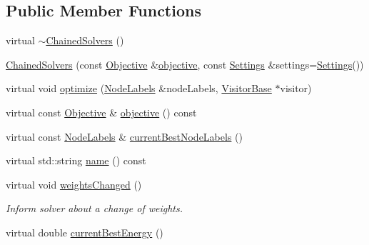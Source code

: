 \subsection*{Public Member Functions}
\begin{DoxyCompactItemize}
\item 
virtual \hyperlink{classnifty_1_1graph_1_1ChainedSolvers_a54c7367c6886af3dc8d484c9ed1d2cc5}{$\sim$\+Chained\+Solvers} ()
\item 
\hyperlink{classnifty_1_1graph_1_1ChainedSolvers_aa15e6835ad08bbc1daf51f676887b9bf}{Chained\+Solvers} (const \hyperlink{classnifty_1_1graph_1_1ChainedSolvers_a963bd16d8459fe660e207c4a57facf5e}{Objective} \&\hyperlink{classnifty_1_1graph_1_1ChainedSolvers_a2ab1b10b87194aa4f4139e4a9ad16632}{objective}, const \hyperlink{structnifty_1_1graph_1_1ChainedSolvers_1_1Settings}{Settings} \&settings=\hyperlink{structnifty_1_1graph_1_1ChainedSolvers_1_1Settings}{Settings}())
\item 
virtual void \hyperlink{classnifty_1_1graph_1_1ChainedSolvers_a1459a25679420dbca4fdecad9ed182fd}{optimize} (\hyperlink{classnifty_1_1graph_1_1ChainedSolvers_a68ac6338bbf4e29e0324152d462715de}{Node\+Labels} \&node\+Labels, \hyperlink{classnifty_1_1graph_1_1ChainedSolvers_a1f90d20ae903cad5e6434d4019b28463}{Visitor\+Base} $\ast$visitor)
\item 
virtual const \hyperlink{classnifty_1_1graph_1_1ChainedSolvers_a963bd16d8459fe660e207c4a57facf5e}{Objective} \& \hyperlink{classnifty_1_1graph_1_1ChainedSolvers_a2ab1b10b87194aa4f4139e4a9ad16632}{objective} () const 
\item 
virtual const \hyperlink{classnifty_1_1graph_1_1ChainedSolvers_a68ac6338bbf4e29e0324152d462715de}{Node\+Labels} \& \hyperlink{classnifty_1_1graph_1_1ChainedSolvers_a5a83f2befc63b62a7925427b252b93bd}{current\+Best\+Node\+Labels} ()
\item 
virtual std\+::string \hyperlink{classnifty_1_1graph_1_1ChainedSolvers_a3ba4c6ab8a961b79f67ddbec23659430}{name} () const 
\item 
virtual void \hyperlink{classnifty_1_1graph_1_1ChainedSolvers_af141004d09e61bf1f8369f838ab0524f}{weights\+Changed} ()
\begin{DoxyCompactList}\small\item\em Inform solver about a change of weights. \end{DoxyCompactList}\item 
virtual double \hyperlink{classnifty_1_1graph_1_1ChainedSolvers_ae387881603a426c47de8caaf7717ff72}{current\+Best\+Energy} ()
\end{DoxyCompactItemize}


